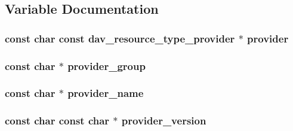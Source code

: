 \subsection{Variable Documentation}
\subsubsection[{\texorpdfstring{provider}{provider}}]{\setlength{\rightskip}{0pt plus 5cm}const char const {\bf dav\+\_\+resource\+\_\+type\+\_\+provider} $\ast$ provider}\hypertarget{group__APACHE__CORE__PROVIDER_gaf2965ad047e50f953739b8977445ed88}{}\label{group__APACHE__CORE__PROVIDER_gaf2965ad047e50f953739b8977445ed88}
\subsubsection[{\texorpdfstring{provider\+\_\+group}{provider_group}}]{\setlength{\rightskip}{0pt plus 5cm}const char $\ast$ provider\+\_\+group}\hypertarget{group__APACHE__CORE__PROVIDER_ga18132929f57a6c2d0891c61c1c0cb8d7}{}\label{group__APACHE__CORE__PROVIDER_ga18132929f57a6c2d0891c61c1c0cb8d7}
\subsubsection[{\texorpdfstring{provider\+\_\+name}{provider_name}}]{\setlength{\rightskip}{0pt plus 5cm}const char $\ast$ provider\+\_\+name}\hypertarget{group__APACHE__CORE__PROVIDER_gac9b5b8486ecec94f244ca0a7dd0dada4}{}\label{group__APACHE__CORE__PROVIDER_gac9b5b8486ecec94f244ca0a7dd0dada4}
\subsubsection[{\texorpdfstring{provider\+\_\+version}{provider_version}}]{\setlength{\rightskip}{0pt plus 5cm}const char const char $\ast$ provider\+\_\+version}\hypertarget{group__APACHE__CORE__PROVIDER_ga291e44ce8408a927d2d5c4538fb0b600}{}\label{group__APACHE__CORE__PROVIDER_ga291e44ce8408a927d2d5c4538fb0b600}
